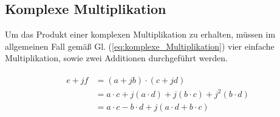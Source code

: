 \subsection{Komplexe Multiplikation}\label{sec:komplexe_Multiplikation}

Um das Produkt einer komplexen Multiplikation zu erhalten, müssen im allgemeinen Fall gemäß Gl. (\ref{eq:komplexe_Multiplikation}) vier einfache Multiplikation, sowie zwei Additionen durchgeführt werden.


\begin{align}\label{eq:komplexe_Multiplikation}
\begin{split}
 e + jf &= (a + jb) \cdot (c + jd)\\
        &= a \cdot c + j(a \cdot d) + j(b \cdot c) + j^2(b \cdot d)\\
        &= a \cdot c - b \cdot d + j(a \cdot d + b \cdot c)
\end{split}
  \end{align}


